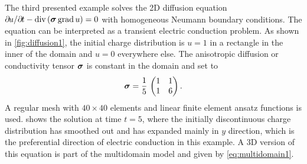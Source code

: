 The third presented example solves the 2D diffusion equation $\partial u/\partial t - \div(\bfsigma\,\grad u) = 0$ with homogeneous Neumann boundary conditions. The equation can be interpreted as a transient electric conduction problem. As shown in \cref{fig:diffusion1}, the initial charge distribution is $u=1$ in a rectangle in the inner of the domain and $u=0$ everywhere else. The anisotropic diffusion or conductivity tensor $\boldsymbol{\sigma}$ is constant in the domain and set to %
\begin{align*}
  \boldsymbol{\sigma} = \frac15\,\left(\begin{matrix}1 & 1\\
              1 & 6\end{matrix}\right).
\end{align*}
A regular mesh with $40\times 40$ elements and linear finite element ansatz functions is used.  shows the solution at time $t=5$, where the initially discontinuous charge distribution has smoothed out and has expanded mainly in $y$ direction, which is the preferential direction of electric conduction in this example. A 3D version of this equation is part of the multidomain model and given by \cref{eq:multidomain1}.

